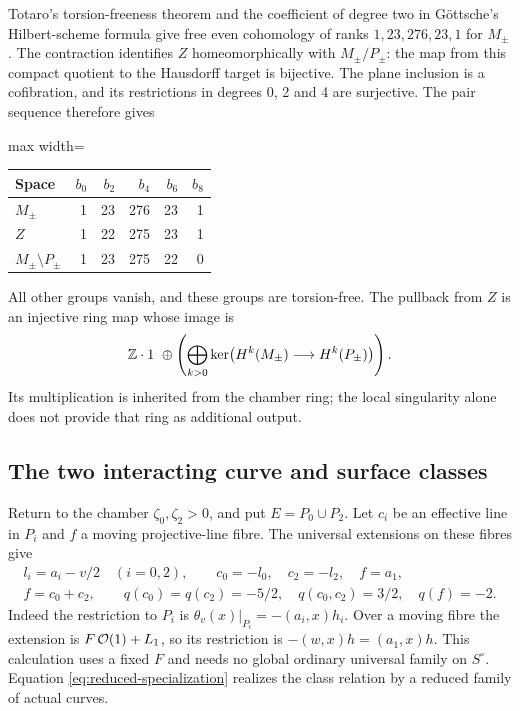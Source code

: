 Totaro's torsion-freeness theorem
\cite[Theorem~3.1]{totaro} and the coefficient of
degree two in G\"ottsche's Hilbert-scheme formula
\cite{gottsche} give free even cohomology of ranks
$1,23,276,23,1$ for $M_\pm$. The contraction identifies
$Z$ homeomorphically with $M_\pm/P_\pm$: the map
from this compact quotient to the Hausdorff target
is bijective. The plane inclusion is a cofibration,
and its restrictions in degrees 0, 2 and 4 are
surjective. The pair sequence therefore gives
\begin{center}
\begin{adjustbox}{max width=\textwidth}
\begin{tabular}{lrrrrr}
\toprule
Space & $b_0$ & $b_2$ & $b_4$ & $b_6$ & $b_8$\\
\midrule
$M_\pm$ & 1&23&276&23&1\\
$Z$ &1&22&275&23&1\\
$M_\pm\setminus P_\pm$ &1&23&275&22&0\\
\bottomrule
\end{tabular}
\end{adjustbox}
\end{center}
All other groups vanish, and these groups are
torsion-free. The pullback from $Z$ is an injective
ring map whose image is
\begin{equation}\label{eq:isolated-target-ring}
 \mathbb Z\cdot1\ \oplus\left(\bigoplus_{k>0}
 \ker\bigl(H^k(M_\pm)\longrightarrow H^k(P_\pm)\bigr)\right).
\end{equation}
Its multiplication is inherited from the chamber
ring; the local singularity alone does not provide
that ring as additional output.

\subsection{The two interacting curve and surface classes}
Return to the chamber $\zeta_0,\zeta_2>0$, and put
$E=P_0\cup P_2$. Let $c_i$ be an effective line in
$P_i$ and $f$ a moving projective-line fibre. The
universal extensions on these fibres give
\begin{equation}\label{eq:interacting-curve-classes}
 \begin{gathered}
 l_i=a_i-v/2\quad(i=0,2),\qquad
 c_0=-l_0,\quad c_2=-l_2,\quad f=a_1,\\
 f=c_0+c_2,\qquad
 q(c_0)=q(c_2)=-5/2,\quad q(c_0,c_2)=3/2,\quad q(f)=-2.
 \end{gathered}
\end{equation}
Indeed the restriction to $P_i$ is
$\theta_v(x)|_{P_i}=-(a_i,x)h_i$. Over a moving
fibre the extension is $F\,\mathcal O(1)+L_1$, so its
restriction is $-(w,x)h=(a_1,x)h$. This calculation
uses a fixed $F$ and needs no global ordinary
universal family on $S^\circ$. Equation
\eqref{eq:reduced-specialization} realizes the class
relation by a reduced family of actual curves.

